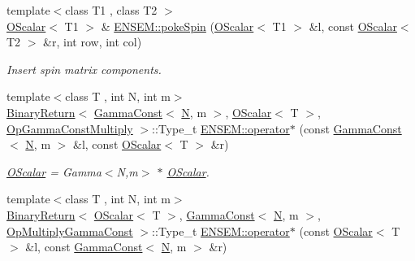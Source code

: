 \begin{DoxyCompactItemize}
{\footnotesize template$<$class T1 , class T2 $>$ }\\\mbox{\hyperlink{classENSEM_1_1OScalar}{O\+Scalar}}$<$ T1 $>$ \& \mbox{\hyperlink{group__obsscalar_gadabf69e63453311d92faee77643c2b7a}{E\+N\+S\+E\+M\+::poke\+Spin}} (\mbox{\hyperlink{classENSEM_1_1OScalar}{O\+Scalar}}$<$ T1 $>$ \&l, const \mbox{\hyperlink{classENSEM_1_1OScalar}{O\+Scalar}}$<$ T2 $>$ \&r, int row, int col)
\begin{DoxyCompactList}\small\item\em Insert spin matrix components. \end{DoxyCompactList}\item 
{\footnotesize template$<$class T , int N, int m$>$ }\\\mbox{\hyperlink{structENSEM_1_1BinaryReturn}{Binary\+Return}}$<$ \mbox{\hyperlink{classENSEM_1_1GammaConst}{Gamma\+Const}}$<$ \mbox{\hyperlink{operator__name__util_8cc_a7722c8ecbb62d99aee7ce68b1752f337}{N}}, m $>$, \mbox{\hyperlink{classENSEM_1_1OScalar}{O\+Scalar}}$<$ T $>$, \mbox{\hyperlink{structENSEM_1_1OpGammaConstMultiply}{Op\+Gamma\+Const\+Multiply}} $>$\+::Type\+\_\+t \mbox{\hyperlink{group__obsscalar_ga3db0be55f47b788fa0f005d8e7bcfbac}{E\+N\+S\+E\+M\+::operator$\ast$}} (const \mbox{\hyperlink{classENSEM_1_1GammaConst}{Gamma\+Const}}$<$ \mbox{\hyperlink{operator__name__util_8cc_a7722c8ecbb62d99aee7ce68b1752f337}{N}}, m $>$ \&l, const \mbox{\hyperlink{classENSEM_1_1OScalar}{O\+Scalar}}$<$ T $>$ \&r)
\begin{DoxyCompactList}\small\item\em \mbox{\hyperlink{classENSEM_1_1OScalar}{O\+Scalar}} = Gamma$<$\+N,m$>$ $\ast$ \mbox{\hyperlink{classENSEM_1_1OScalar}{O\+Scalar}}. \end{DoxyCompactList}\item 
{\footnotesize template$<$class T , int N, int m$>$ }\\\mbox{\hyperlink{structENSEM_1_1BinaryReturn}{Binary\+Return}}$<$ \mbox{\hyperlink{classENSEM_1_1OScalar}{O\+Scalar}}$<$ T $>$, \mbox{\hyperlink{classENSEM_1_1GammaConst}{Gamma\+Const}}$<$ \mbox{\hyperlink{operator__name__util_8cc_a7722c8ecbb62d99aee7ce68b1752f337}{N}}, m $>$, \mbox{\hyperlink{structENSEM_1_1OpMultiplyGammaConst}{Op\+Multiply\+Gamma\+Const}} $>$\+::Type\+\_\+t \mbox{\hyperlink{group__obsscalar_ga1a9ed6642b9c94843e7a8c143c2f0236}{E\+N\+S\+E\+M\+::operator$\ast$}} (const \mbox{\hyperlink{classENSEM_1_1OScalar}{O\+Scalar}}$<$ T $>$ \&l, const \mbox{\hyperlink{classENSEM_1_1GammaConst}{Gamma\+Const}}$<$ \mbox{\hyperlink{operator__name__util_8cc_a7722c8ecbb62d99aee7ce68b1752f337}{N}}, m $>$ \&r)

\end{DoxyCompactItemize}
